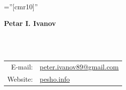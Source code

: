 \documentclass[a4paper,10pt]{article}
\def\name{Petar I. Ivanov}
\newcommand{\minorcolor}[1]{\textcolor{mygray}{#1}}
\begin{document}
\pagestyle{empty}				%
\font\fb=''[cmr10]''				%

\begin{figure}
	\setlength\fboxsep{0pt}
	\setlength\fboxrule{0.1pt}
        \vspace{-20pt}
\end{figure}

\par{\raggedright\Huge\textbf{\vspace{-3mm}\hspace{0mm}\name}}\\		%
\vspace{-5mm}{\color{linegray}\rule{10.5cm}{0.1mm}}\\

\hspace{4mm}\begin{tabular}{rl}
	\minorcolor{E-mail:} & \href{mailto:peter.ivanov89@gmail.com}{peter.ivanov89@gmail.com}\\
	\minorcolor{Website:} & \href{http://pesho.info}{pesho.info}\\
\end{tabular}
\bigskip

\end{document}
